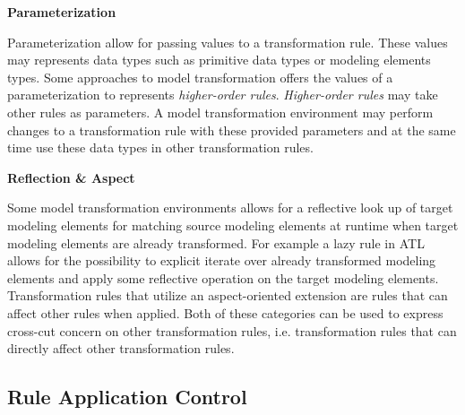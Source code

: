 \textbf{Parameterization}

Parameterization allow for passing values to a transformation rule. These
values may represents data types such as primitive data types or modeling elements
types. Some approaches to model transformation offers the values
of a parameterization to represents \textit{higher-order rules}. 
\textit{Higher-order rules} may take other rules as parameters. A model
transformation environment may perform changes to a transformation rule with
these provided parameters and at the same time use these data types in other
transformation rules.

\textbf{Reflection \& Aspect}

Some model transformation environments allows for a reflective look up of target
modeling elements for matching source modeling elements at runtime when target
modeling elements are already transformed. For example a lazy rule in ATL allows for
the possibility to explicit iterate over already transformed modeling elements
and apply some reflective operation on the target modeling elements. Transformation rules that
utilize an aspect-oriented extension are rules that can affect other rules when
applied. Both of these categories can be used to express cross-cut concern
on other transformation rules, i.e. transformation rules that can directly
affect other transformation rules. 

\subsection{Rule Application Control}
\label{sec:app_control}

